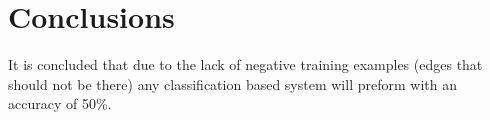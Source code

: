 \section{Conclusions}

It is concluded that due to the lack of negative training examples (edges that should not be there) any classification based system will preform with an accuracy of 50\%.
